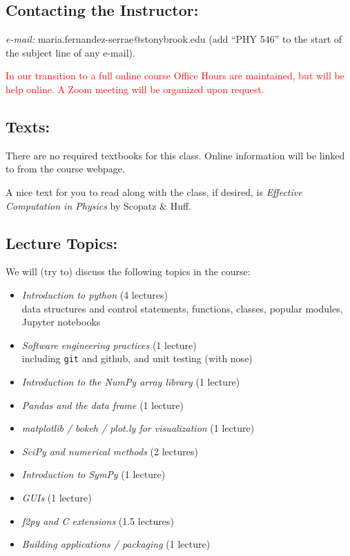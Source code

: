 \documentclass[11pt]{article}
\newenvironment{itemsquish}
  { \begin{itemize}
    \addtolength{\itemsep}{-0.25\baselineskip}
    \addtolength{\baselineskip}{-0.25\baselineskip} }
  { \end{itemize} }
\begin{document}
\subsection*{Contacting the Instructor:}

{\em e-mail:} maria.fernandez-serrae@stonybrook.edu ({add ``PHY 546'' to the
 start of the subject line of any e-mail}).
 
 \textcolor{red}{In our transition to a full online course
 Office Hours are maintained, but will be help online.
 A Zoom meeting will be organized upon request.}


\subsection*{Texts:}

There are no required textbooks for this class.  Online information
will be linked to from the course webpage.

A nice text for you to read along with the class, if desired, is
{\em Effective Computation in Physics}\/ by Scopatz \& Huff.



\subsection*{Lecture Topics:}

We will (try to) discuss the following topics in the course:
%
\begin{itemsquish}
\item {\em Introduction to python} (4 lectures) \\ data structures and
  control statements, functions, classes, popular modules, Jupyter
  notebooks

\item {\em Software engineering practices} (1 lecture) \\
  including {\tt git} and github, and unit testing (with nose)

\item {\em Introduction to the NumPy array library} (1 lecture)

\item {\em Pandas and the data frame} (1 lecture)

\item {\em matplotlib / bokeh / plot.ly for visualization} (1 lecture)

\item {\em SciPy and numerical methods} (2 lectures)

\item {\em Introduction to SymPy} (1 lecture)

\item {\em GUIs} (1 lecture)

\item {\em f2py and C extensions} (1.5 lectures)

\item {\em Building applications / packaging} (1 lecture)
\end{itemsquish}
\end{document}
